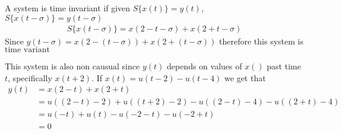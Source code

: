 \documentclass[12pt]{article}
\begin{document}
A system is time invariant if given $S\{x(t)\}=y(t)$, $S\{x(t-\sigma)\}=y(t-\sigma)$
\begin{align*}
S\{x(t-\sigma)\}=x(2-t-\sigma)+x(2+t-\sigma)
\end{align*}
Since $y(t-\sigma)=x(2-(t-\sigma))+x(2+(t-\sigma))$ therefore this system is $\boxed{\text{time variant}}$

This system is also $\boxed{\text{non causual}}$ since $y(t)$ depends on values of $x()$ past time $t$, specifically $x(t+2)$.
If $x(t)=u(t-2)-u(t-4)$ we get that
\begin{align*}
y(t)&=x(2-t)+x(2+t)\\
&=u((2-t)-2)+u((t+2)-2)-u((2-t)-4)-u((2+t)-4)\\
&=u(-t)+u(t)-u(-2-t)-u(-2+t)\\
&=\boxed{0}
\end{align*}
\end{document}
